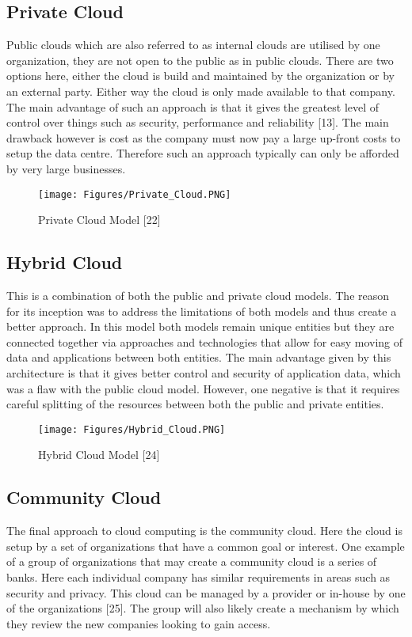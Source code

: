 \documentclass[oneside,12pt]{Classes/RoboticsLaTeX}
\begin{document}
\subsection{Private Cloud}
Public clouds which are also referred to as internal clouds are utilised by one organization, they are not open to the public as in public clouds. There are two options here, either the cloud is build and maintained by the organization or by an external party. Either way the cloud is only made available to that company. The main advantage of such an approach is that it gives the greatest level of control over things such as security, performance and reliability [13]. The main drawback however is cost as the company must now pay a large up-front costs to setup the data centre. Therefore such an approach typically can only be afforded by very large businesses. 

\begin{figure}[h]
\centering
\texttt{[image: Figures/Private\_Cloud.PNG]}
\caption{Private Cloud Model [22]}
\end{figure}

\subsection{Hybrid Cloud}
This is a combination of both the public and private cloud models. The reason for its inception was to address the limitations of both models and thus create a better approach. In this model both models remain unique entities but they are connected together via approaches and technologies that allow for easy moving of data and applications between both entities. The main advantage given by this architecture is that it gives better control and security of application data, which was a flaw with the public cloud model. However, one negative is that it requires careful splitting of the resources between both the public and private entities. 

\begin{figure}[h]
\centering
\texttt{[image: Figures/Hybrid\_Cloud.PNG]}
\caption{Hybrid Cloud Model [24]}
\end{figure}

\subsection{Community Cloud}
The final approach to cloud computing is the community cloud. Here the cloud is setup by a set of organizations that have a common goal or interest. One example of a group of organizations that may create a community cloud is a series of banks. Here each individual company has similar requirements in areas such as security and privacy. This cloud can be managed by a provider or in-house by one of the organizations [25]. The group will also likely create a mechanism by which they review the new companies looking to gain access. 
\end{document}
